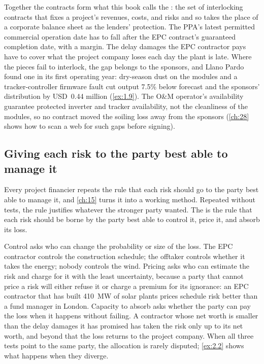 Together the contracts form what this book calls the : the set of interlocking contracts that fixes a project's revenues, costs, and risks and so takes the place of a corporate balance sheet as the lenders' protection. The PPA's latest permitted commercial operation date has to fall after the EPC contract's guaranteed completion date, with a margin. The delay damages the EPC contractor pays have to cover what the project company loses each day the plant is late. Where the pieces fail to interlock, the gap belongs to the sponsors, and Llano Pardo found one in its first operating year: dry-season dust on the modules and a tracker-controller firmware fault cut output 7.5\% below forecast and the sponsors' distribution by USD~0.44 million (\cref{ex:1.9}). The O\&M operator's availability guarantee protected inverter and tracker availability, not the cleanliness of the modules, so no contract moved the soiling loss away from the sponsors (\cref{ch:28} shows how to scan a web for such gaps before signing).

\subsection{Giving each risk to the party best able to manage it}\label{ssec:2.3.2}

Every project financier repeats the rule that each risk should go to the party best able to manage it, and \cref{ch:15} turns it into a working method. Repeated without tests, the rule justifies whatever the stronger party wanted. The  is the rule that each risk should be borne by the party best able to control it, price it, and absorb its loss.

Control asks who can change the probability or size of the loss. The EPC contractor controls the construction schedule; the offtaker controls whether it takes the energy; nobody controls the wind. Pricing asks who can estimate the risk and charge for it with the least uncertainty, because a party that cannot price a risk will either refuse it or charge a premium for its ignorance: an EPC contractor that has built 410~MW of solar plants prices schedule risk better than a fund manager in London. Capacity to absorb asks whether the party can pay the loss when it happens without failing. A contractor whose net worth is smaller than the delay damages it has promised has taken the risk only up to its net worth, and beyond that the loss returns to the project company. When all three tests point to the same party, the allocation is rarely disputed; \cref{ex:2.2} shows what happens when they diverge.

